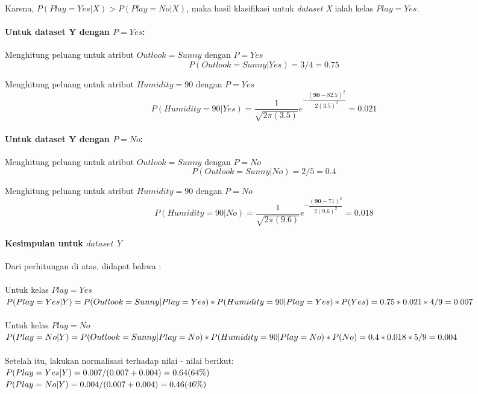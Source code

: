 	Karena, $P(Play=Yes|X) > P(Play=No|X)$, maka hasil klasifikasi untuk \textit{dataset X} ialah kelas $Play=Yes$.
	
	\paragraph{Untuk dataset Y dengan $P=Yes$:}
	Menghitung peluang untuk atribut $Outlook=Sunny$ dengan $P=Yes$
	\begin{displaymath}
			P(Outlook=Sunny|Yes) = 3/4 
			= 0.75
	\end{displaymath}
	
	Menghitung peluang untuk atribut $Humidity=90$ dengan $P=Yes$
		\begin{displaymath}
			P(Humidity=90|Yes) 
			= \dfrac{1}{\sqrt{2\pi(3.5)}}e^{-\dfrac{(\textbf{90}-82.5)^2}{2(3.5)^2}}
			= 0.021
		\end{displaymath}
	
	\paragraph{Untuk dataset Y dengan $P=No$:}
	Menghitung peluang untuk atribut $Outlook=Sunny$ dengan $P=No$
	\begin{displaymath}
				P(Outlook=Sunny|No)
				= 2/5 
				= 0.4
		\end{displaymath}
	
	Menghitung peluang untuk atribut $Humidity=90$ dengan $P=No$
		\begin{displaymath}
			P(Humidity=90|No)
			= \dfrac{1}{\sqrt{2\pi(9.6)}}e^{-\dfrac{(\textbf{90}-71)^2}{2(9.6)^2}} 
			= 0.018
		\end{displaymath}
		
	\paragraph{Kesimpulan untuk $dataset$ $Y$}
	Dari perhitungan di atas, didapat bahwa : \\ \\
	Untuk kelas $Play=Yes$ \\
	$P(Play=Yes|Y) \\
	= P(Outlook=Sunny|Play=Yes)*P(Humidity=90|Play=Yes)*P(Yes) \\
	= 0.75 * 0.021 * 4/9 \\
	= 0.007$ \\ \\
	Untuk kelas $Play=No$ \\
	$P(Play=No|Y) \\
	= P(Outlook=Sunny|Play=No)*P(Humidity=90|Play=No)*P(No) \\
	= 0.4 * 0.018 * 5/9 \\
	= 0.004$ \\ \\
	Setelah itu, lakukan normalisasi terhadap nilai - nilai berikut: \\
	$P(Play=Yes|Y) = 0.007 / (0.007+0.004) \\
	= 0.64 (64\%)$ \\
	$P(Play=No|Y) = 0.004 / (0.007+0.004) \\
	= 0.46 (46\%)$ \\
	
